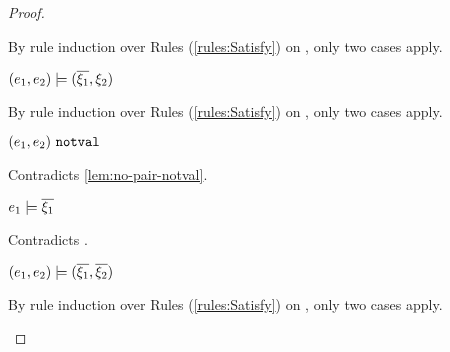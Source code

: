 \begin{proof}
\begin{byCases}
\begin{byCases}
\begin{byCases}
\begin{byCases}
\begin{pfsteps*}
                \end{pfsteps*}
                By rule induction over Rules (\ref{rules:Satisfy}) on , only two cases apply.
                \begin{byCases}
                \item[\text{(\ref{rule:CSOr1})}]
                    \begin{pfsteps*}
                    \item $(e_1 , e_2) \models (\overline{\xi_1} , \xi_2)$  
                    \end{pfsteps*}
                    By rule induction over Rules (\ref{rules:Satisfy}) on , only two cases apply.
                    \begin{byCases}
                    \item[\text{(\ref{rule:CSNotValPair})}]
                        \begin{pfsteps*}
                        \item $(e_1 , e_2) ~\mathtt{notval}$ 
                        \end{pfsteps*}
                        Contradicts \autoref{lem:no-pair-notval}.
                    \item[\text{(\ref{rule:CSPair})}]
                        \begin{pfsteps*}
                        \item $e_1 \models \overline{\xi_1}$ 
                        \end{pfsteps*}
                        Contradicts .
                    \end{byCases}
                \item[\text{(\ref{rule:CSOr2})}]
                    \begin{pfsteps*}
                    \item $(e_1 , e_2) \models (\overline{\xi_1} , \overline{\xi_2})$  
                    \end{pfsteps*}
                    By rule induction over Rules (\ref{rules:Satisfy}) on , only two cases apply.
                   \begin{byCases}

\end{byCases}
\end{byCases}
\end{byCases}
\end{byCases}
\end{byCases}
\end{byCases}
\end{proof}
